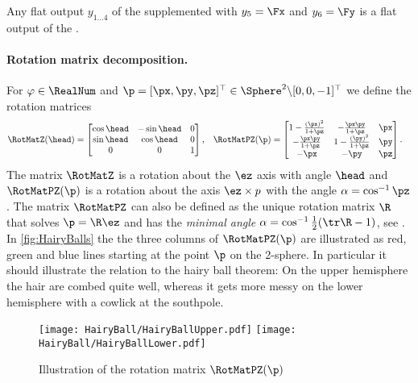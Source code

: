 Any flat output $y_{1\ldots4}$ of the \Quadcopter supplemented with $y_5=\Fx$ and $y_6=\Fy$ is a flat output of the \Tricopter.

\paragraph{Rotation matrix decomposition.}
For $\varphi \in \RealNum$ and $\p = [\px,\py,\pz]^\top \in \Sphere^2 \backslash [0,0,-1]^\top$ we define the rotation matrices
\begin{align}
 \RotMatZ(\head) &=
 \begin{bmatrix}
  \cos\head & -\sin\head & 0 \\
  \sin\head & \cos\head & 0 \\
  0 & 0 & 1
 \end{bmatrix},&
 \RotMatPZ(\p) &=
 \begin{bmatrix}
  1 - \frac{(\px)^2}{1+\pz} & -\frac{\px \py}{1+\pz} & \px \\
  -\frac{\px \py}{1+\pz} & 1 - \frac{(\py)^2}{1+\pz} & \py \\
  -\px & -\py & \pz
 \end{bmatrix}.
\end{align}
The matrix $\RotMatZ$ is a rotation about the $\ez$ axis with angle $\head$ and $\RotMatPZ(\p)$ is a rotation about the axis $\ez \times p$ with the angle $\alpha = \cos^{-1} \pz$.
The matrix $\RotMatPZ$ can also be defined as the unique rotation matrix $\R$ that solves $\p = \R \ez$ and has the \textit{minimal angle} $\alpha = \cos^{-1} \tfrac{1}{2}(\tr \R - 1)$, see \cite{Konz:QuadrotorMovingFrame}.
In \autoref{fig:HairyBalls} the the three columns of $\RotMatPZ(\p)$ are illustrated as red, green and blue lines starting at the point $\p$ on the 2-sphere.
In particular it should illustrate the relation to the hairy ball theorem:
On the upper hemisphere the hair are combed quite well, whereas it gets more messy on the lower hemisphere with a cowlick at the southpole. 

%  

\begin{figure}[ht]
 \texttt{[image: HairyBall/HairyBallUpper.pdf]}
 \texttt{[image: HairyBall/HairyBallLower.pdf]}
 \caption{Illustration of the rotation matrix $\RotMatPZ(\p)$}
 \label{fig:HairyBalls}
\end{figure}

